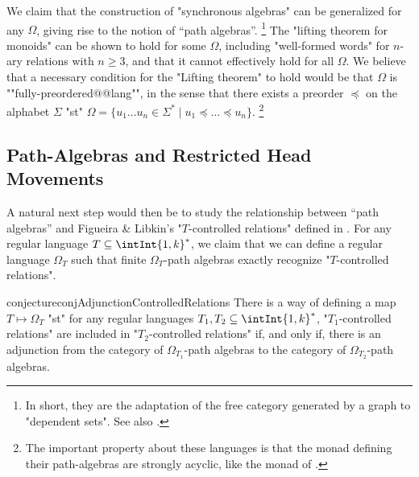 We claim that the construction of "synchronous algebras"
can be generalized for any $\Omega$, giving rise to the notion of ``path algebras''.%
\footnote{In short, they are the adaptation of
the free category generated by a graph to "dependent sets". See also .}
The "lifting theorem for monoids" can be shown to hold for some $\Omega$, including "well-formed words" for $n$-ary relations with $n\geq 3$, and that it cannot effectively hold for all $\Omega$.
We believe that a necessary condition for the "Lifting theorem" to hold
would be that $\Omega$ is ""fully-preordered@@lang"",
in the sense that there exists a preorder $\preccurlyeq$ on the alphabet $\Sigma$
"st" $\Omega = \{u_1 \dotsc u_n \in \Sigma^* \mid u_1 \preccurlyeq \dotsc \preccurlyeq u_n\}$.%
\footnote{The important property about these languages is that
the monad defining their path-algebras are strongly acyclic, like the
monad of .}

\subsection{Path-Algebras and Restricted Head Movements}

A natural next step would then be to study the relationship between ``path algebras'' and
Figueira \& Libkin's "$T$-controlled relations" defined
in .
For any regular language $T \subseteq \intInt{1,k}^*$, we claim that we can define a regular language $\Omega_T$ such that finite $\Omega_T$-path algebras exactly recognize 
"$T$-controlled relations".

\begin{restatable}{conjecture}{conjAdjunctionControlledRelations}
	\label{conj:adjunction-controlled-relations}
	There is a way of defining a map $T \mapsto \Omega_T$ "st"
	for any regular languages $T_1, T_2 \subseteq \intInt{1,k}^*$,
	"$T_1$-controlled relations" are included in "$T_2$-controlled relations" if, and only if,
	there is an adjunction from the category of $\Omega_{T_1}$-path algebras to the category of
	$\Omega_{T_2}$-path algebras.
\end{restatable}


